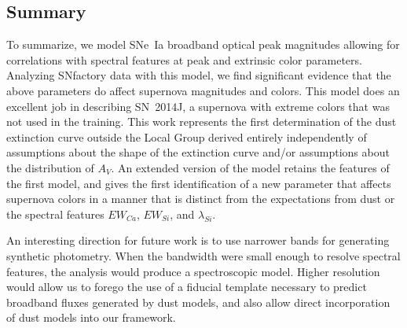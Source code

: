 \documentclass{aastex61}   	%
\begin{document}
\subsection{Summary}
To summarize, we model SNe~Ia broadband optical peak magnitudes allowing for correlations with spectral features at peak and
extrinsic color parameters.  Analyzing SNfactory data with this model, we find significant evidence that the above parameters do
affect supernova magnitudes and colors.  This model  does an excellent job in
describing SN~2014J, a supernova with extreme colors that was not used in the training.  
This work represents the first determination of the dust extinction curve outside the Local Group
derived entirely independently of assumptions about the shape of the extinction curve and/or assumptions about the
distribution of $A_V$.  An extended version
of the model retains the features of the first model, and gives the first identification of  a new parameter that affects supernova
colors in a manner that is distinct from  the expectations from dust or the spectral features $EW_{Ca}$, $EW_{Si}$, and $\lambda_{Si}$.

An interesting direction for future work is to use narrower bands for generating synthetic photometry.  When the bandwidth were small enough
to resolve spectral features, the analysis would produce a spectroscopic model.   Higher resolution would allow us to forego 
the use of a fiducial template necessary to predict broadband fluxes generated by dust models, and also allow direct incorporation
of dust models into our framework.
\end{document}
